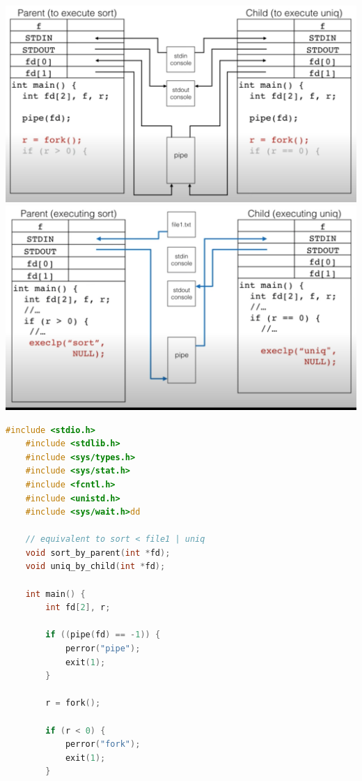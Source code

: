 \documentclass[12pt]{article}
\begin{document}
\begin{itemize}
\begin{itemize}
\begin{itemize}
            \begin{center}
            \includegraphics[width=\linewidth]{images/week_11_notes_1_1.png}
            \includegraphics[width=\linewidth]{images/week_11_notes_1_2.png}
            \end{center}
        \end{itemize}

    \begin{lstlisting}[language=c, caption={pipe\_example\_1.c}]
    #include <stdio.h>
    #include <stdlib.h>
    #include <sys/types.h>
    #include <sys/stat.h>
    #include <fcntl.h>
    #include <unistd.h>
    #include <sys/wait.h>dd

    // equivalent to sort < file1 | uniq
    void sort_by_parent(int *fd);
    void uniq_by_child(int *fd);

    int main() {
        int fd[2], r;

        if ((pipe(fd) == -1)) {
            perror("pipe");
            exit(1);
        }

        r = fork();

        if (r < 0) {
            perror("fork");
            exit(1);
        }


\end{lstlisting}
\end{itemize}
\end{itemize}
\end{document}
